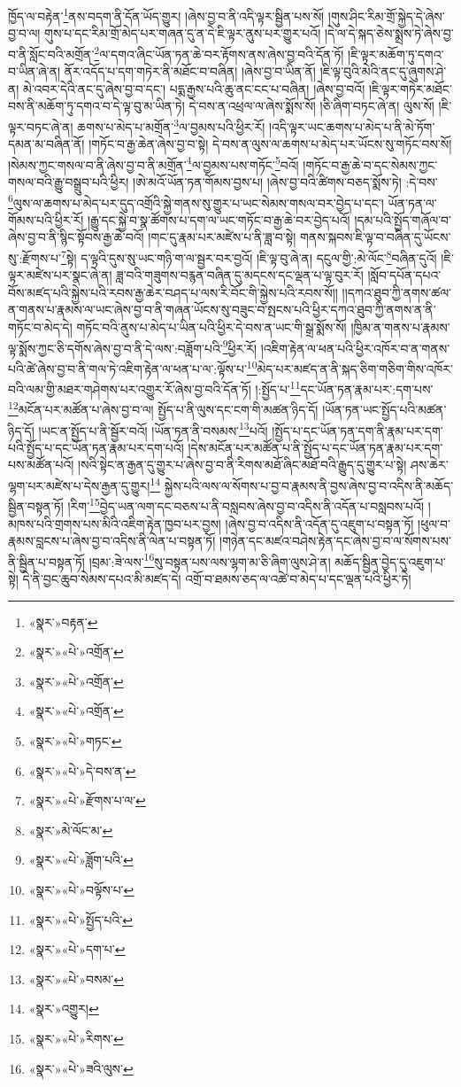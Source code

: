 ཁྱོད་ལ་བརྟེན་\footnote{«སྣར་»བརྟན་}ནས་བདག་ནི་དོན་ཡོད་གྱུར། །ཞེས་བྱ་བ་ནི་འདི་ལྟར་སྦྱིན་པས་སོ། །གུས་ཤིང་རིམ་གྲོ་སྐྱེད་དེ་ཞེས་བྱ་བ་ལ། གུས་པ་དང་རིམ་གྲོ་མེད་པར་གཞན་དུ་ན་དེ་ཇི་ལྟར་ནུས་པར་གྱུར་པའོ། །དེ་ལ་དེ་སྐད་ཅེས་སྨྲས་ཏེ་ཞེས་བྱ་བ་ནི་སློང་བའི་མགྲོན་\footnote{«སྣར་»«པེ་»འགྲོན་}ལ་དགའ་ཞིང་ཡོན་ཏན་ཆེ་བར་རྟོགས་ནས་ཞེས་བྱ་བའི་དོན་ཏོ། །ཇི་ལྟར་མཆོག་ཏུ་དགའ་བ་ཡིན་ཞེ་ན། ནོར་འདོད་པ་དག་གཏེར་ནི་མཐོང་བ་བཞིན། །ཞེས་བྱ་བ་ཡིན་ནོ། །ཇི་ལྟ་བུའི་མེའི་ནང་དུ་ཞུགས་ཤེ་ན། མེ་འབར་དེའི་ནང་དུ་ཞེས་བྱ་བ་དང་། པདྨ་རྒྱས་པའི་ཆུ་ནང་ངང་པ་བཞིན། །ཞེས་བྱ་བའོ། །ཇི་ལྟར་གཏེར་མཐོང་བས་ནི་མཆོག་ཏུ་དགའ་བ་དེ་ལྟ་བུ་མ་ཡིན་ཏེ། དེ་བས་ན་འཕྲལ་ལ་ཞེས་སྨོས་སོ། །ཅི་ཞིག་བཏང་ཞེ་ན། ལུས་སོ། །ཇི་ལྟར་བཏང་ཞེ་ན། ཆགས་པ་མེད་པ་མགྲོན་\footnote{«སྣར་»«པེ་»འགྲོན་}ལ་བྱམས་པའི་ཕྱིར་རོ། །འདི་ལྟར་ཡང་ཆགས་པ་མེད་པ་ནི་མེ་ཏོག་དམན་མ་བཞིན་ནོ། །གཏོང་བ་རྒྱ་ཆེན་ཞེས་བྱ་བ་སྟེ། དེ་བས་ན་ལུས་ལ་ཆགས་པ་མེད་པར་ཡོངས་སུ་གཏོང་བས་སོ། །སེམས་ཀྱང་གསལ་བ་ནི་ཞེས་བྱ་བ་ནི་མགྲོན་\footnote{«སྣར་»«པེ་»འགྲོན་}ལ་བྱམས་པས་གཏོང་\footnote{«སྣར་»«པེ་»གཏང་}བའོ། །གཏོང་བ་རྒྱ་ཆེ་བ་དང་སེམས་ཀྱང་གསལ་བའི་རྒྱུ་བསྒྲུབ་པའི་ཕྱིར། །ཨེ་མའོ་ཡོན་ཏན་གོམས་བྱས་པ། །ཞེས་བྱ་བའི་ཚིགས་བཅད་སྨོས་ཏེ། :དེ་བས་\footnote{«སྣར་»«པེ་»དེ་བས་ན་}ལུས་ལ་ཆགས་པ་མེད་པར་དུད་འགྲོའི་སྐྱེ་གནས་སུ་གྱུར་པ་ཡང་སེམས་གསལ་བར་བྱེད་པ་དང་། ཡོན་ཏན་ལ་གོམས་པའི་ཕྱིར་རོ། །རྒྱུ་དང་སྐྱེ་བ་སྣ་ཚོགས་པ་དག་ལ་ཡང་གཏོང་བ་རྒྱ་ཆེ་བར་བྱེད་པའོ། །དམ་པའི་སྤྱོད་གཞོལ་བ་ཞེས་བྱ་བ་ནི་སྙིང་སྟོབས་རྒྱ་ཆེ་བའོ། །གང་དུ་རྣམ་པར་མཛེས་པ་ནི་ཟླ་བ་སྟེ། གནས་སྐབས་ཇི་ལྟ་བ་བཞིན་དུ་ཡོངས་སུ་:རྫོགས་པ་\footnote{«སྣར་»«པེ་»རྫོགས་པ་ལ་}སྟེ། ད་ལྟའི་དུས་སུ་ཡང་གཉི་ག་ལ་སྦྱར་བར་བྱའོ། །ཇི་ལྟ་བུ་ཞེ་ན། དངུལ་གྱི་:མེ་ལོང་\footnote{«སྣར་»མེ་ལོང་མ་}བཞིན་དུའོ། །ཇི་ལྟར་མཛེས་པར་སྣང་ཞེ་ན། ཟླ་བའི་གཟུགས་བརྙན་བཞིན་དུ་མདངས་དང་ལྡན་པ་ལྟ་བུར་རོ། །སློབ་དཔོན་དཔའ་བོས་མཛད་པའི་སྐྱེས་པའི་རབས་རྒྱ་ཆེར་བཤད་པ་ལས་རི་བོང་གི་སྐྱེས་པའི་རབས་སོ།། །།དཀའ་ཐུབ་ཀྱི་ནགས་ཚལ་ན་གནས་པ་རྣམས་ལ་ཡང་ཞེས་བྱ་བ་ནི་གཞན་ཡོངས་སུ་བཟུང་བ་སྤངས་པའི་ཕྱིར་དཀའ་ཐུབ་ཀྱི་ནགས་ན་ནི་གཏོང་བ་མེད་དེ། གཏོང་བའི་ནུས་པ་མེད་པ་ཡིན་པའི་ཕྱིར་དེ་བས་ན་ཡང་གི་སྒྲ་སྨོས་སོ། །ཁྱིམ་ན་གནས་པ་རྣམས་ལྟ་སྨོས་ཀྱང་ཅི་དགོས་ཞེས་བྱ་བ་ནི་དེ་ལས་:བཟློག་པའི་\footnote{«སྣར་»«པེ་»ཟློག་པའི་}ཕྱིར་རོ། །འཇིག་རྟེན་ལ་ཕན་པའི་ཕྱིར་འཁོར་བ་ན་གནས་པའི་ཚེ་ཞེས་བྱ་བ་ནི་གལ་ཏེ་འཇིག་རྟེན་ལ་ཕན་པ་ལ་:ལྟོས་པ་\footnote{«སྣར་»«པེ་»བལྟོས་པ་}མེད་པར་མཛད་ན་ནི་སྐད་ཅིག་གཅིག་གིས་འཁོར་བའི་ལམ་གྱི་མཐར་གཤེགས་པར་འགྱུར་རོ་ཞེས་བྱ་བའི་དོན་ཏོ། །:སྤྱོད་པ་\footnote{«སྣར་»«པེ་»སྤྱོད་པའི་}དང་ཡོན་ཏན་རྣམ་པར་:དག་པས་\footnote{«སྣར་»«པེ་»དག་པ་}མངོན་པར་མཚོན་པ་ཞེས་བྱ་བ་ལ། སྤྱོད་པ་ནི་ལུས་དང་ངག་གི་མཚན་ཉིད་དོ། །ཡོན་ཏན་ཡང་སྤྱོད་པའི་མཚན་ཉིད་དོ། །ཡང་ན་སྤྱོད་པ་ནི་སྦྱོར་བའོ། །ཡོན་ཏན་ནི་བསམས་\footnote{«སྣར་»«པེ་»བསམ་}པའོ། །སྤྱོད་པ་དང་ཡོན་ཏན་དག་ནི་རྣམ་པར་དག་པའི་སྤྱོད་པ་དང་ཡོན་ཏན་རྣམ་པར་དག་པའོ། །དེས་མངོན་པར་མཚོན་པ་ནི་སྤྱོད་པ་དང་ཡོན་ཏན་རྣམ་པར་དག་པས་མཚོན་པའོ། །སའི་སྟེང་ན་རྒྱན་དུ་གྱུར་པ་ཞེས་བྱ་བ་ནི་རིགས་མཐོ་ཞིང་མཐོ་བའི་རྒྱུད་དུ་གྱུར་པ་སྟེ། ཤས་ཆེར་ལྷག་པར་མཛེས་པ་དེས་རྒྱན་དུ་གྱུར།\footnote{«སྣར་»འགྱུར།} སྐྱེས་པའི་ལས་ལ་སོགས་པ་བྱ་བ་རྣམས་ནི་བྱས་ཞེས་བྱ་བ་འདིས་ནི་མཆོད་སྦྱིན་བསྟན་ཏོ། །རིག་\footnote{«སྣར་»«པེ་»རིགས་}བྱེད་ཡན་ལག་དང་བཅས་པ་ནི་བསླབས་ཞེས་བྱ་བ་འདིས་ནི་འདོན་པ་བསླབས་པའོ། །མཁས་པའི་གྲགས་པས་མིའི་འཇིག་རྟེན་ཁྱབ་པར་བྱས། །ཞེས་བྱ་བ་འདིས་ནི་འདོན་དུ་འཇུག་པ་བསྟན་ཏོ། །ཕུལ་བ་རྣམས་བླངས་པ་ཞེས་བྱ་བ་འདིས་ནི་ལེན་པ་བསྟན་ཏོ། །གཉེན་དང་མཛའ་བཤེས་རྟེན་དང་ཞེས་བྱ་བ་ལ་སོགས་པས་ནི་སྦྱིན་པ་བསྟན་ཏོ། །བྲམ་:ཟེ་ལས་\footnote{«སྣར་»«པེ་»ཟའི་ལུས་}སུ་བསྟན་པས་ལས་ལྷག་མ་ཅི་ཞིག་ལུས་ཤེ་ན། མཆོད་སྦྱིན་བྱེད་དུ་འཇུག་པ་སྟེ། དེ་ནི་བྱང་ཆུབ་སེམས་དཔའ་མི་མཛད་དེ། འགྲོ་བ་ཐམས་ཅད་ལ་འཚེ་བ་མེད་པ་དང་ལྡན་པའི་ཕྱིར་ཏེ། 